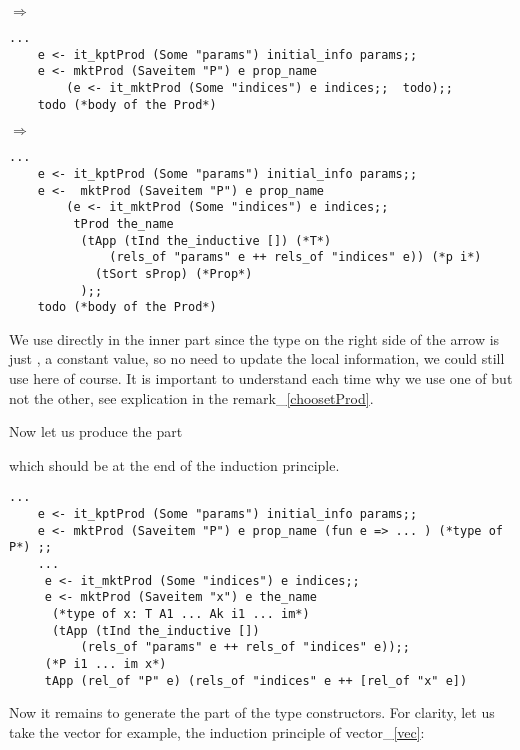 \documentclass[a4paper,UKenglish,cleveref, autoref, thm-restate]{lipics-v2021}
\begin{document}
$\Longrightarrow$
\begin{lstlisting}[language = {Coq}, basicstyle = \small]
    ...
    e <- it_kptProd (Some "params") initial_info params;;
    e <- mktProd (Saveitem "P") e prop_name
        (e <- it_mktProd (Some "indices") e indices;;  todo);;
    todo (*body of the Prod*)
\end{lstlisting}

$\Longrightarrow$
\begin{lstlisting}[language = {Coq}, basicstyle = \small]
    ...
    e <- it_kptProd (Some "params") initial_info params;;
    e <-  mktProd (Saveitem "P") e prop_name
        (e <- it_mktProd (Some "indices") e indices;;
         tProd the_name
          (tApp (tInd the_inductive []) (*T*)
              (rels_of "params" e ++ rels_of "indices" e)) (*p i*)
            (tSort sProp) (*Prop*)
          );;
    todo (*body of the Prod*)
\end{lstlisting}

We use  directly in the inner part since the type on the right side of the arrow is just , a constant value, so no need to update the local information, we could still use  here of course. It is important to understand each time why we use one of  but not the other, see explication in the remark_\ref{choosetProd}.

Now let us produce the part 


which should be at the end of the induction principle.
\begin{lstlisting}[language = {Coq}, basicstyle = \small]
    ...
    e <- it_kptProd (Some "params") initial_info params;;
    e <- mktProd (Saveitem "P") e prop_name (fun e => ... ) (*type of P*) ;;
    ...
     e <- it_mktProd (Some "indices") e indices;;
     e <- mktProd (Saveitem "x") e the_name
      (*type of x: T A1 ... Ak i1 ... im*)
      (tApp (tInd the_inductive [])
          (rels_of "params" e ++ rels_of "indices" e));;
     (*P i1 ... im x*)
     tApp (rel_of "P" e) (rels_of "indices" e ++ [rel_of "x" e])
\end{lstlisting}

Now it remains to generate the part of the type constructors. For clarity, let us take the vector for example,
the induction principle of vector_\ref{vec}:
\end{document}
